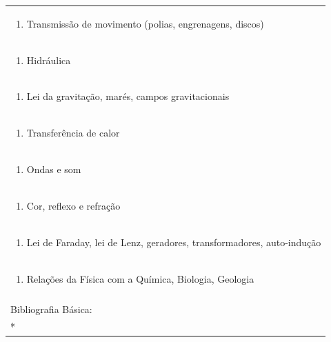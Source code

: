 \documentclass[11pt]{article}
\begin{document}
\begin{center}
\begin{longtable}{|p{4cm}|p{4cm}|p{4cm}|p{4cm}|}
\multicolumn{4}{|p{\dimexpr 16cm + 6\tabcolsep\relax}|}{\begin{enumerate}[start=2]\item Transmissão de movimento (polias, engrenagens, discos)\end{enumerate}}\\
\multicolumn{4}{|p{\dimexpr 16cm + 6\tabcolsep\relax}|}{\begin{enumerate}[start=3]\item Hidráulica\end{enumerate}}\\
\multicolumn{4}{|p{\dimexpr 16cm + 6\tabcolsep\relax}|}{\begin{enumerate}[start=4]\item Lei da gravitação, marés, campos gravitacionais\end{enumerate}}\\
\multicolumn{4}{|p{\dimexpr 16cm + 6\tabcolsep\relax}|}{\begin{enumerate}[start=5]\item Transferência de calor\end{enumerate}}\\
\multicolumn{4}{|p{\dimexpr 16cm + 6\tabcolsep\relax}|}{\begin{enumerate}[start=6]\item Ondas e som\end{enumerate}}\\
\multicolumn{4}{|p{\dimexpr 16cm + 6\tabcolsep\relax}|}{\begin{enumerate}[start=7]\item Cor, reflexo e refração\end{enumerate}}\\
\multicolumn{4}{|p{\dimexpr 16cm + 6\tabcolsep\relax}|}{\begin{enumerate}[start=8]\item Lei de Faraday, lei de Lenz, geradores, transformadores, auto-indução\end{enumerate}}\\
\multicolumn{4}{|p{\dimexpr 16cm + 6\tabcolsep\relax}|}{\begin{enumerate}[start=9]\item Relações da Física com a Química, Biologia, Geologia\end{enumerate}}\\
\multicolumn{4}{|p{\dimexpr 16cm + 6\tabcolsep\relax}|}{}\\
\hline
\multicolumn{4}{|p{16cm}|}{Bibliografia Básica:}\\*

\end{longtable}
\end{center}
\end{document}
